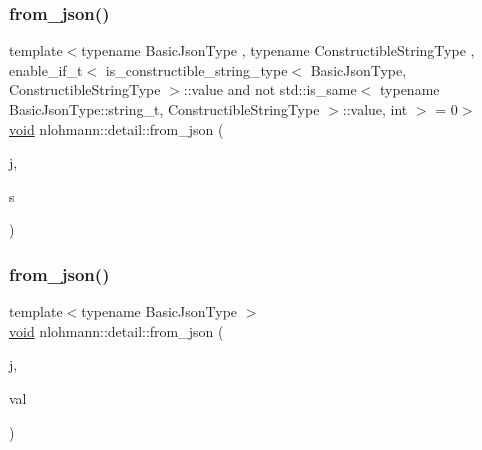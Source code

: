 \subsubsection{\texorpdfstring{from\+\_\+json()}{from\_json()}\hspace{0.1cm}{\footnotesize\ttfamily [4/18]}}
{\footnotesize\ttfamily template$<$typename Basic\+Json\+Type , typename Constructible\+String\+Type , enable\+\_\+if\+\_\+t$<$ is\+\_\+constructible\+\_\+string\+\_\+type$<$ Basic\+Json\+Type, Constructible\+String\+Type $>$\+::value and not std\+::is\+\_\+same$<$ typename Basic\+Json\+Type\+::string\+\_\+t, Constructible\+String\+Type $>$\+::value, int $>$  = 0$>$ \\
\hyperlink{namespacenlohmann_1_1detail_a59fca69799f6b9e366710cb9043aa77d}{void} nlohmann\+::detail\+::from\+\_\+json (\begin{DoxyParamCaption}\item[{const Basic\+Json\+Type \&}]{j,  }\item[{Constructible\+String\+Type \&}]{s }\end{DoxyParamCaption})}

\mbox{\label{namespacenlohmann_1_1detail_a7cb5dd7d46a60e65f9a8e0873b3f7dd8}} 
\subsubsection{\texorpdfstring{from\+\_\+json()}{from\_json()}\hspace{0.1cm}{\footnotesize\ttfamily [5/18]}}
{\footnotesize\ttfamily template$<$typename Basic\+Json\+Type $>$ \\
\hyperlink{namespacenlohmann_1_1detail_a59fca69799f6b9e366710cb9043aa77d}{void} nlohmann\+::detail\+::from\+\_\+json (\begin{DoxyParamCaption}\item[{const Basic\+Json\+Type \&}]{j,  }\item[{typename Basic\+Json\+Type\+::number\+\_\+float\+\_\+t \&}]{val }\end{DoxyParamCaption})}

\mbox{\label{namespacenlohmann_1_1detail_ace4d5680ba413d9fd897ccb5d9c61a1c}} 
